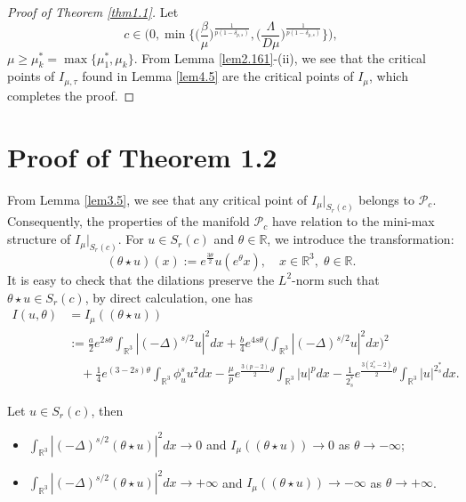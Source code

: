 \documentclass[reqno]{amsart}
\begin{document}
\begin{proof}[Proof of Theorem \ref{thm1.1}]
 Let 
\[
c\in\Big(0, \min\Big\{\big(\frac{\beta}{\mu}\big)^{\frac{1}{p(1-\delta_{p,s})}}, 
\big(\frac{\Lambda}{D\mu}\big)^{\frac{1}{p(1-\delta_{p,s})}}\Big\}\Big),
\]
 $\mu\geq \mu^*_k=\max\{\mu^*_1, \mu_k\}$. From Lemma \ref{lem2.161}-(ii), 
 we see that the critical points of $I_{\mu, \tau}$ found in Lemma \ref{lem4.5} 
are the critical points of $I_\mu$, which completes the proof.
\end{proof}

\section{Proof of Theorem 1.2}

From Lemma \ref{lem3.5}, we see that any critical point of $I_\mu|_{S_r(c)}$ belongs 
to $\mathcal{P}_c$. Consequently, the properties of the manifold $\mathcal{P}_c$ have  
relation to the mini-max structure of $I_\mu|_{ S_{r}(c)}$. For $u\in  S_{r}(c)$ and 
$\theta\in \mathbb{R}$, we introduce the transformation:
\[ %
(\theta \star u)(x):=e^{\frac{3\theta}{2}}u(e^\theta x), \quad
x\in \mathbb{R}^3,\;\theta \in \mathbb{R}.
\]
It is easy to check that the dilations preserve the $L^2$-norm such that
$\theta \star u\in  S_{r}(c)$, by direct calculation, one has
\begin{align*}%
I(u,\theta)
&= I_\mu((\theta \star u))\\
&:= \frac{a}{2}e^{2s\theta}\int_{\mathbb{R}^3}|(-\Delta)^{s/2}u|^2dx
+\frac{b}{4}e^{4s\theta}\Big(\int_{\mathbb{R}^3}|(-\Delta)^{s/2}u|^2dx\Big)^2\\
&\quad +\frac{1}{4}e^{(3-2s)\theta}\int_{\mathbb{R}^3}\phi^s_u u^2dx-\frac{\mu}{p}e^{\frac{3(p-2)}{2}\theta}\int_{\mathbb{R}^3}|u|^pdx-
\frac{1}{2^*_s}e^{\frac{3(2^*_s-2)}{2}\theta}\int_{\mathbb{R}^3}|u|^{2^*_s}dx.
\end{align*}

\begin{lemma}\label{lem5.1}
Let $u\in  S_{r}(c)$, then
\begin{itemize}
\item[(i)] $\int_{\mathbb{R}^3}|(-\Delta)^{s/2}(\theta \star u)|^2dx\to 0$ and 
$I_\mu((\theta \star u))\to 0$ as $\theta \to -\infty$;

\item[(ii)] $\int_{\mathbb{R}^3}|(-\Delta)^{s/2}(\theta \star u)|^2dx\to +\infty$ and 
$I_\mu((\theta \star u))\to -\infty$ as $\theta \to +\infty$.
\end{itemize}
\end{lemma}
\end{document}
